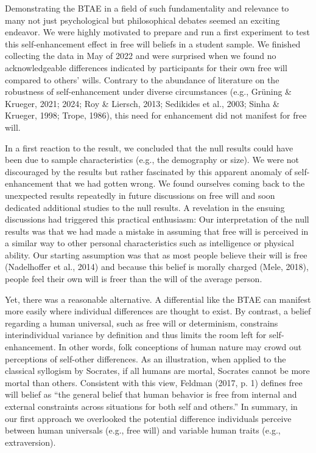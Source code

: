\documentclass[authordate, anecdote]{jote-new-article}
\begin{document}
	Demonstrating the BTAE in a field of such fundamentality and relevance to many not just psychological but philosophical debates seemed an exciting endeavor. We were highly motivated to prepare and run a first experiment to test this self-enhancement effect in free will beliefs in a student sample. We finished collecting the data in May of 2022 and were surprised when we found no acknowledgeable differences indicated by participants for their own free will compared to others' wills. Contrary to the abundance of literature on the robustness of self-enhancement under diverse circumstances (e.g., Grüning \& Krueger, 2021; 2024; Roy \& Liersch, 2013; Sedikides et al., 2003; Sinha \& Krueger, 1998; Trope, 1986), this need for enhancement did not manifest for free will.



	In a first reaction to the result, we concluded that the null results could have been due to sample characteristics (e.g., the demography or size). We were not discouraged by the results but rather fascinated by this apparent anomaly of self-enhancement that we had gotten wrong. We found ourselves coming back to the unexpected results repeatedly in future discussions on free will and soon dedicated additional studies to the null results. A revelation in the ensuing discussions had triggered this practical enthusiasm: Our interpretation of the null results was that we had made a mistake in assuming that free will is perceived in a similar way to other personal characteristics such as intelligence or physical ability. Our starting assumption was that as most people believe their will is free (Nadelhoffer et al., 2014) and because this belief is morally charged (Mele, 2018), people feel their own will is freer than the will of the average person.



	Yet, there was a reasonable alternative. A differential like the BTAE can manifest more easily where individual differences are thought to exist. By contrast, a belief regarding a human universal, such as free will or determinism, constrains interindividual variance by definition and thus limits the room left for self-enhancement. In other words, folk conceptions of human nature may crowd out perceptions of self-other differences. As an illustration, when applied to the classical syllogism by Socrates, if all humans are mortal, Socrates cannot be more mortal than others. Consistent with this view, Feldman (2017, p. 1) defines free will belief as “the general belief that human behavior is free from internal and external constraints across situations for both self and others.” In summary, in our first approach we overlooked the potential difference individuals perceive between human universals (e.g., free will) and variable human traits (e.g., extraversion).
\end{document}
